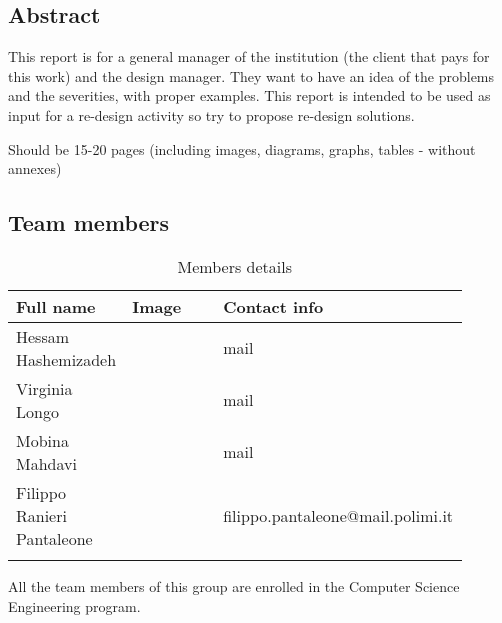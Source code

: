\subsection{Abstract}
This report is for a general manager of the institution (the client that pays for this work) and the design manager. They want to have an idea of the problems and the severities, with proper examples.
This report is intended to be used as input for a re-design activity so try to propose re-design solutions.

Should be 15-20 pages (including images, diagrams, graphs, tables - without annexes)

\subsection{Team members}
\begin{longtable}
    {|m{0.2\linewidth}|m{0.2\linewidth}|m{0.5\linewidth}|}
            \hline
            \textbf{Full name} & \textbf{Image} & \textbf{Contact info}\\
            \hline
            \endhead
                Hessam Hashemizadeh &
                \centering
                & mail \\
            \hline
                Virginia Longo  &
                \centering
                & mail \\
            \hline
                Mobina Mahdavi &
                \centering
                & mail \\
            \hline
                Filippo Ranieri Pantaleone &
                \centering
                & filippo.pantaleone@mail.polimi.it \\
            \hline
            \caption{Members details}
            \label{table:mem_details}
\end{longtable}

All the team members of this group are enrolled in the Computer Science Engineering program.

\newpage

